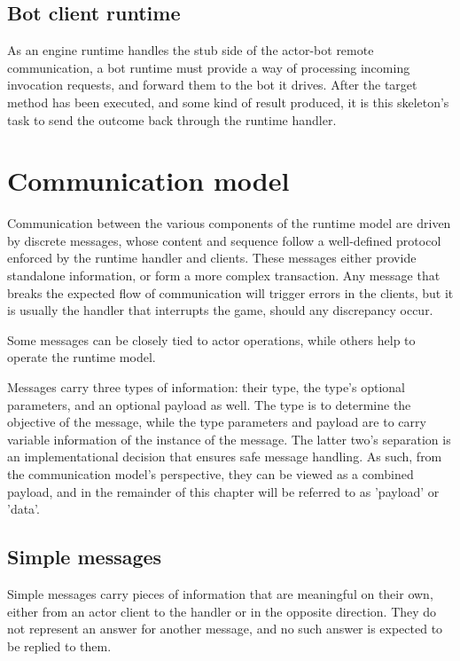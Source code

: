 		\subsection*{Bot client runtime}
		
		As an engine runtime handles the stub side of the actor-bot remote communication, a bot runtime must provide a way of processing incoming invocation requests, and forward them to the bot it drives. After the target method has been executed, and some kind of result produced, it is this skeleton's task to send the outcome back through the runtime handler.

	\section{Communication model}

		Communication between the various components of the runtime model are driven by discrete messages, whose content and sequence follow a well-defined protocol enforced by the runtime handler and clients. These messages either provide standalone information, or form a more complex transaction. Any message that breaks the expected flow of communication will trigger errors in the clients, but it is usually the handler that interrupts the game, should any discrepancy occur.
		
		Some messages can be closely tied to actor operations, while others help to operate the runtime model. 

		Messages carry three types of information: their type, the type's optional parameters, and an optional payload as well. The type is to determine the objective of the message, while the type parameters and payload are to carry variable information of the instance of the message. The latter two's separation is an implementational decision that ensures safe message handling. As such, from the communication model's perspective, they can be viewed as a combined payload, and in the remainder of this chapter will be referred to as 'payload' or 'data'.  

		\subsection*{Simple messages}
		
		Simple messages carry pieces of information that are meaningful on their own, either from an actor client to the handler or in the opposite direction. They do not represent an answer for another message, and no such answer is expected to be replied to them.
		
